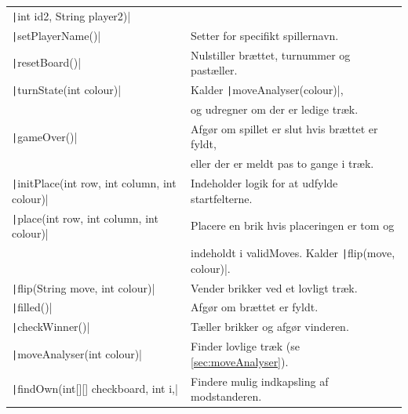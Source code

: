 \begin{table}[H]
\begin{tabular}{ll}
        \quad \texttt|int id2, String player2)|             &                                                                       \\
        \texttt|setPlayerName()|                            & Setter for specifikt spillernavn.                                     \\
        \texttt|resetBoard()|                               & Nulstiller brættet, turnummer og pastæller.                           \\
        \texttt|turnState(int colour)|                      & Kalder \texttt|moveAnalyser(colour)|,                       \\
                                                                      & og udregner om der er ledige træk.                                    \\
        \texttt|gameOver()|                                 & Afgør om spillet er slut hvis brættet er fyldt,                       \\
                                                                      & eller der er meldt pas to gange i træk.                               \\
        \texttt|initPlace(int row, int column, int colour)| & Indeholder logik for at udfylde startfelterne.                        \\
        \texttt|place(int row, int column, int colour)|     & Placere en brik hvis placeringen er tom og                            \\
                                                                      & indeholdt i validMoves. Kalder \texttt|flip(move, colour)|. \\
        \texttt|flip(String move, int colour)|              & Vender brikker ved et lovligt træk.                                   \\
        \texttt|filled()|                                   & Afgør om brættet er fyldt.                                            \\
        \texttt|checkWinner()|                              & Tæller brikker og afgør vinderen.                                     \\
        \texttt|moveAnalyser(int colour)|                   & Finder lovlige træk (se \cref{sec:moveAnalyser}).                     \\
        \texttt|findOwn(int[][] checkboard, int i,|         & Findere mulig indkapsling af modstanderen.                            \\

\end{tabular}
\end{table}
